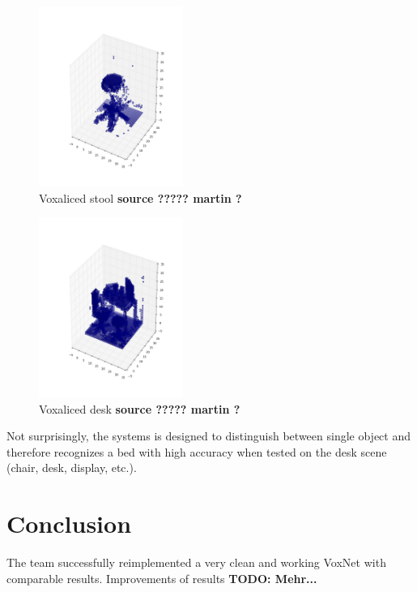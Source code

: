 \documentclass[10pt,twocolumn,letterpaper]{article}
\begin{document}
\begin{figure}[h]
	\label{fig:voxel_stool}
	\centering
	\includegraphics[width=0.42\textwidth]{figures/tango_voxel_stool}
	\caption{Voxaliced stool \textbf{ source ????? martin ?}}
\end{figure}


\begin{figure}[h]
	\label{fig:voxel_desk}
	\centering
	\includegraphics[width=0.42\textwidth]{figures/tango_voxel_desk_scene}
	\caption{Voxaliced desk \textbf{source ????? martin ?}}
\end{figure}

Not surprisingly, the systems is designed to distinguish between single object and therefore recognizes a bed with high accuracy when
tested on the desk scene (chair, desk, display, etc.).

\section{Conclusion}

The team successfully reimplemented a very clean and working VoxNet with comparable results.
Improvements of results 
\textbf{TODO: Mehr...}

{\small


}
\end{document}
